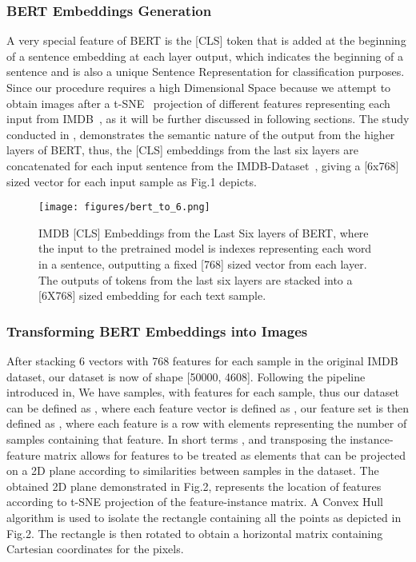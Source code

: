 \documentclass[conference]{IEEEtran}
\begin{document}
\subsubsection{BERT Embeddings Generation}
                A very special feature of BERT is the [CLS] token that is added at the 
				beginning of a sentence embedding at each layer output, which indicates 
				the beginning of a sentence and is also a unique Sentence Representation
				for classification purposes. Since our procedure requires a high Dimensional Space because we attempt to obtain images after a t-SNE~\cite{tsne} projection of different features representing each input from IMDB~\cite{imdb}, as it will be further discussed in following sections. The study conducted in \cite{bertvisual}, demonstrates the semantic nature of the output from the higher layers of BERT, thus, the [CLS] embeddings from the last six layers are concatenated for each input sentence from the IMDB-Dataset~\cite{imdb}, giving a [6x768] sized vector for each input sample as Fig.1 depicts.
				
				\begin{figure}[htpb]
                \centerline{\texttt{[image: figures/bert\_to\_6.png]}}
                \caption{IMDB [CLS] Embeddings from the Last Six layers of BERT, where the input to the pretrained model is indexes representing each word in a sentence, outputting a fixed [768] sized vector from each layer. The outputs of  tokens from the last six layers are stacked into a [6X768] sized embedding for each text sample.}
                \label{figure-1}
                \end{figure}
                
\subsubsection{Transforming BERT Embeddings into Images}
                After stacking 6 vectors with 768 features for each sample in the original IMDB~\cite{imdb} dataset, our dataset is now of shape [50000, 4608]. Following the pipeline introduced in\cite{deepinsight}, We have  samples, with  features for each sample, thus our dataset can be defined as , where each feature vector  is defined as , our feature set is then defined as , where each feature  is a row with  elements representing the number of samples containing that feature. In short terms , and transposing the instance-feature matrix allows for features to be treated as elements that can be projected on a 2D plane according to similarities between samples in the dataset. The obtained 2D plane demonstrated in Fig.2, represents the location of features according to t-SNE projection of the feature-instance matrix. A Convex Hull algorithm is used to isolate the rectangle containing all the points as depicted in Fig.2. The rectangle is then rotated to obtain a horizontal matrix containing Cartesian coordinates for the pixels. 
                
\end{document}
